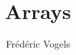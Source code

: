 \documentclass{../khlslides}
\title[Arrays]{Arrays}
\author{Fr\'ed\'eric Vogels}
\begin{document}
\begin{frame}
  \titlepage
\end{frame}



% 
\end{document}
